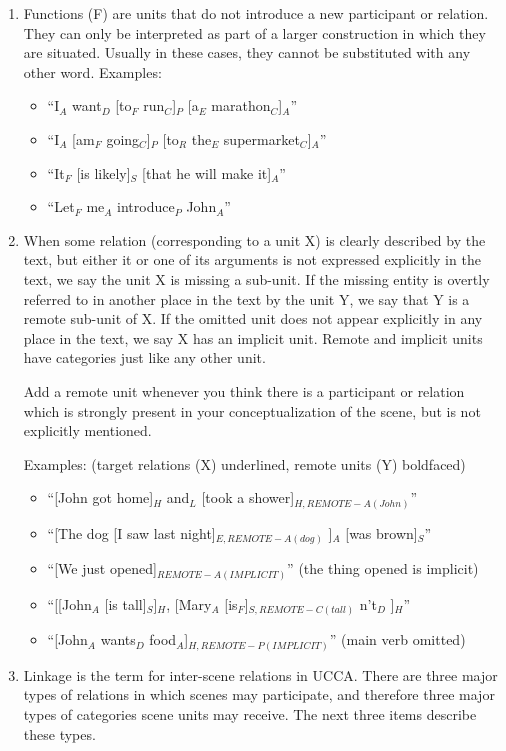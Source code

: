 \documentclass[11pt]{article}
\begin{document}
\begin{enumerate}
\item
Functions (F) are units that do not introduce a new participant or relation. They can only be interpreted as part of a larger construction in which they are situated. Usually in these cases, they cannot be substituted with any other word.
Examples:
\begin{itemize}
\item
``I$_A$ want$_D$ [to$_F$ run$_C$]$_P$ [a$_E$ marathon$_C$]$_A$''
\item
``I$_A$ [am$_F$ going$_C$]$_P$ [to$_R$ the$_E$ supermarket$_C$]$_A$''
\item
``It$_F$ [is likely]$_S$ [that he will make it]$_A$''
\item
``Let$_F$ me$_A$ introduce$_P$ John$_A$''
\end{itemize}

\item
When some relation (corresponding to a unit X) is clearly described by the text, but either it or one of its arguments is not expressed explicitly in the text, we say the unit X is missing a sub-unit. If the missing entity is overtly referred to in another place in the text by the unit Y, we say that Y is a remote sub-unit of X. If the omitted unit does not appear explicitly in any place in the text, we say X has an implicit unit. Remote and implicit units have categories just like any other unit.

Add a remote unit whenever you think there is a participant or relation which is strongly present in your conceptualization of the scene, but is not explicitly mentioned.

Examples: (target relations (X) underlined, remote units (Y) boldfaced)

\begin{itemize}
\item	``[John got home]$_H$ and$_L$ [took a shower]$_{H,REMOTE-A(John)}$''
\item	``[The dog [I saw last night]$_{E,REMOTE-A(dog)}$ ]$_A$ [was brown]$_S$''
\item 	``[We just opened]$_{REMOTE-A(IMPLICIT)}$'' (the thing opened is implicit)
\item   ``[[John$_A$ [is tall]$_S$]$_H$, [Mary$_A$ [is$_F$]$_{S,REMOTE-C(tall)}$ n't$_D$ ]$_H$''
\item	``[John$_A$ wants$_D$ food$_A$]$_{H,REMOTE-P(IMPLICIT)}$'' (main verb omitted)
\end{itemize}

\item
Linkage is the term for inter-scene relations in UCCA. There are three major
types of relations in which scenes may participate, and therefore three major types of categories scene units may receive. The next three items describe these types.


\end{enumerate}
\end{document}
